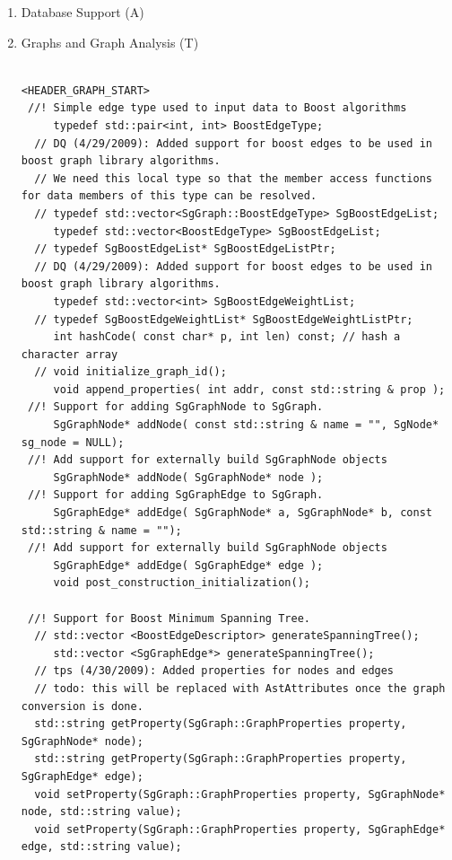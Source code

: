 \begin{enumerate}
\begin{lstlisting}
<QRTree.h>
     TableModel(QRTree *tree);
     int rowCount(const QModelIndex &parent = QModelIndex()) const;
     QVariant data(const QModelIndex &index, int role) const;
     QVariant headerData(int section, Qt::Orientation orientation,
                         int role = Qt::DisplayRole) const;


         \end{lstlisting}

   \item Database Support (A)

   \item Graphs and Graph Analysis (T)

\begin{lstlisting}

<HEADER_GRAPH_START>
 //! Simple edge type used to input data to Boost algorithms
     typedef std::pair<int, int> BoostEdgeType;
  // DQ (4/29/2009): Added support for boost edges to be used in boost graph library algorithms.
  // We need this local type so that the member access functions for data members of this type can be resolved.
  // typedef std::vector<SgGraph::BoostEdgeType> SgBoostEdgeList;
     typedef std::vector<BoostEdgeType> SgBoostEdgeList;
  // typedef SgBoostEdgeList* SgBoostEdgeListPtr;
  // DQ (4/29/2009): Added support for boost edges to be used in boost graph library algorithms.
     typedef std::vector<int> SgBoostEdgeWeightList;
  // typedef SgBoostEdgeWeightList* SgBoostEdgeWeightListPtr;
     int hashCode( const char* p, int len) const; // hash a character array
  // void initialize_graph_id();
     void append_properties( int addr, const std::string & prop );
 //! Support for adding SgGraphNode to SgGraph.
     SgGraphNode* addNode( const std::string & name = "", SgNode* sg_node = NULL);
 //! Add support for externally build SgGraphNode objects
     SgGraphNode* addNode( SgGraphNode* node );
 //! Support for adding SgGraphEdge to SgGraph.
     SgGraphEdge* addEdge( SgGraphNode* a, SgGraphNode* b, const std::string & name = "");
 //! Add support for externally build SgGraphNode objects
     SgGraphEdge* addEdge( SgGraphEdge* edge );
     void post_construction_initialization();

 //! Support for Boost Minimum Spanning Tree.
  // std::vector <BoostEdgeDescriptor> generateSpanningTree();
     std::vector <SgGraphEdge*> generateSpanningTree();
  // tps (4/30/2009): Added properties for nodes and edges
  // todo: this will be replaced with AstAttributes once the graph conversion is done.
  std::string getProperty(SgGraph::GraphProperties property, SgGraphNode* node);
  std::string getProperty(SgGraph::GraphProperties property, SgGraphEdge* edge);
  void setProperty(SgGraph::GraphProperties property, SgGraphNode* node, std::string value);
  void setProperty(SgGraph::GraphProperties property, SgGraphEdge* edge, std::string value);


\end{lstlisting}
\end{enumerate}
